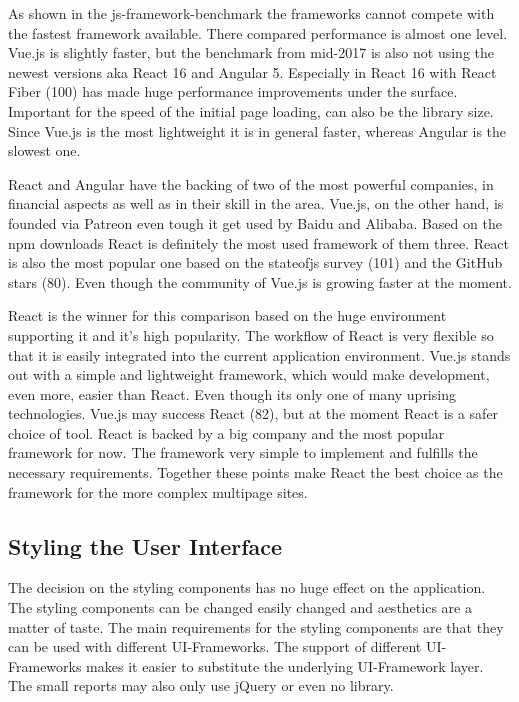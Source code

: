 \documentclass[american,a4paper,oneside,,tablecaptionabove]{scrbook}
\begin{document}
As shown in the js-framework-benchmark the frameworks cannot compete
with the fastest framework available. There compared performance is
almost one level. Vue.js is slightly faster, but the benchmark from
mid-2017 is also not using the newest versions aka React 16 and Angular
5. Especially in React 16 with React Fiber (100) has made huge
performance improvements under the surface. Important for the speed of
the initial page loading, can also be the library size. Since Vue.js is
the most lightweight it is in general faster, whereas Angular is the
slowest one.

React and Angular have the backing of two of the most powerful
companies, in financial aspects as well as in their skill in the area.
Vue.js, on the other hand, is founded via Patreon even tough it get used
by Baidu and Alibaba. Based on the npm downloads React is definitely the
most used framework of them three. React is also the most popular one
based on the stateofjs survey (101) and the GitHub stars (80). Even
though the community of Vue.js is growing faster at the moment.

React is the winner for this comparison based on the huge environment
supporting it and it's high popularity. The workflow of React is very
flexible so that it is easily integrated into the current application
environment. Vue.js stands out with a simple and lightweight framework,
which would make development, even more, easier than React. Even though
its only one of many uprising technologies. Vue.js may success React
(82), but at the moment React is a safer choice of tool. React is backed
by a big company and the most popular framework for now. The framework
very simple to implement and fulfills the necessary requirements.
Together these points make React the best choice as the framework for
the more complex multipage sites.

\subsection{Styling the User
Interface}\label{styling-the-user-interface}

The decision on the styling components has no huge effect on the
application. The styling components can be changed easily changed and
aesthetics are a matter of taste. The main requirements for the styling
components are that they can be used with different UI-Frameworks. The
support of different UI-Frameworks makes it easier to substitute the
underlying UI-Framework layer. The small reports may also only use
jQuery or even no library.
\end{document}
